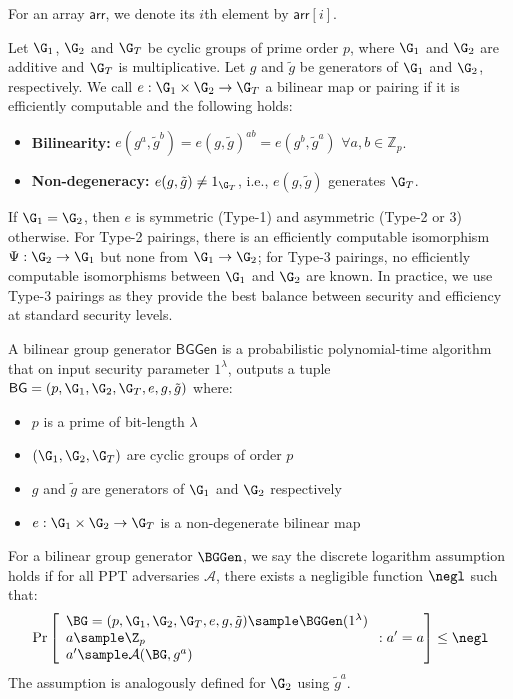 For an array $\mathsf{arr}$, we denote its $i$th element by $\mathsf{arr}[i]$.


\begin{definition}
Let $\G_1$, $\G_2$ and $\G_T$ be cyclic groups of prime order $p$, where $\G_1$ and $\G_2$ are additive and $\G_T$ is multiplicative. Let $g$ and $\tilde{g}$ be generators of $\G_1$ and $\G_2$, respectively. We call $e: \G_1 \times \G_2 \rightarrow \G_T$ a bilinear map or pairing if it is efficiently computable and the following holds:
\begin{itemize}
    \item \textbf{Bilinearity:} $e(g^a, \tilde{g}^b) = e(g, \tilde{g})^{ab} = e(g^b, \tilde{g}^a)$ $\forall a,b \in \mathbb{Z}_p$.
    \item \textbf{Non-degeneracy:} $e(g, \tilde{g}) \neq 1_{\G_T}$, i.e., $e(g, \tilde{g})$ generates $\G_T$.
\end{itemize}

\noindent If $\G_1 = \G_2$, then $e$ is symmetric (Type-1) and asymmetric (Type-2 or 3) otherwise. For Type-2 pairings, there is an efficiently computable isomorphism $\Psi: \G_2 \rightarrow \G_1$ but none from $\G_1 \rightarrow \G_2$; for Type-3 pairings, no efficiently computable isomorphisms between $\G_1$ and $\G_2$ are known. In practice, we use Type-3 pairings as they provide the best balance between security and efficiency at standard security levels.
\end{definition}


\begin{definition}
A bilinear group generator $\mathsf{BGGen}$ is a probabilistic polynomial-time algorithm that on input security parameter $1^\lambda$, outputs a tuple $\mathsf{BG} = (p, \G_1, \G_2, \G_T, e, g, \tilde{g})$ where:
\begin{itemize}
    \item $p$ is a prime of bit-length $\lambda$
    \item $(\G_1, \G_2, \G_T)$ are cyclic groups of order $p$
    \item $g$ and $\tilde{g}$ are generators of $\G_1$ and $\G_2$ respectively
    \item $e: \G_1 \times \G_2 \rightarrow \G_T$ is a non-degenerate bilinear map
\end{itemize}
\end{definition}

\begin{definition}
For a bilinear group generator $\BGGen$, we say the discrete logarithm assumption holds if for all PPT adversaries $\mathcal{A}$, there exists a negligible function $\negl$ such that:
$$\Pr\left[\begin{array}{l}
    \BG = (p, \G_1, \G_2, \G_T, e, g, \tilde{g}) \sample \BGGen(1^\lambda) \\
    a \sample \Z_p \\
    a' \sample \mathcal{A}(\BG, g^a)
\end{array} : a' = a\right] \leq \negl$$
The assumption is analogously defined for $\G_2$ using $\tilde{g}^a$.
\end{definition}



